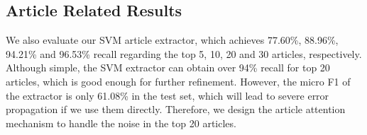 

\subsection{Article Related Results}
We also evaluate our SVM article extractor, which achieves 
77.60\%, 88.96\%, 94.21\% and 96.53\% recall regarding the top 5, 10, 20 and 30 articles, respectively.
Although simple, the SVM extractor can obtain over 94\% recall for top 20 articles, which is good enough for further refinement.
However, the micro F1 of the extractor is only 61.08\% in the test set, which will lead to severe error propagation if we use them directly. Therefore, we design the article attention mechanism to handle the noise in the top 20 articles.


